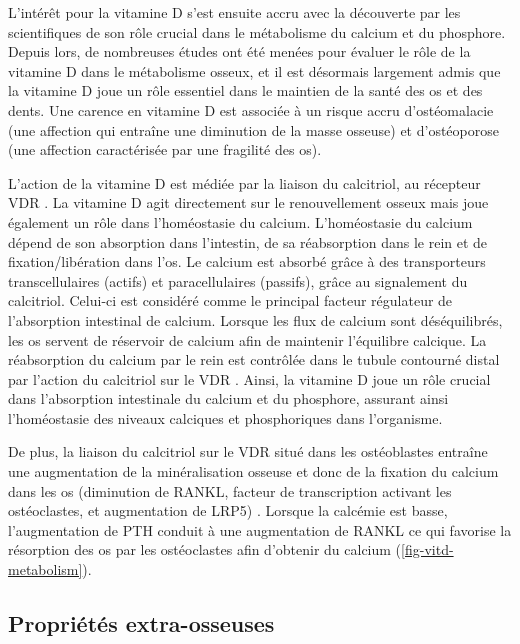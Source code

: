 \documentclass[
  a4paper,
  DIV=11,
  numbers=noendperiod,
  listof=totoc]{scrreprt}
\begin{document}
L'intérêt pour la vitamine D s'est ensuite accru avec la découverte par
les scientifiques de son rôle crucial dans le métabolisme du calcium et
du phosphore. Depuis lors, de nombreuses études ont été menées pour
évaluer le rôle de la vitamine D dans le métabolisme osseux, et il est
désormais largement admis que la vitamine D joue un rôle essentiel dans
le maintien de la santé des os et des dents. Une carence en vitamine D
est associée à un risque accru d'ostéomalacie (une affection qui
entraîne une diminution de la masse osseuse) et d'ostéoporose (une
affection caractérisée par une fragilité des os).

L'action de la vitamine D est médiée par la liaison du calcitriol, au
récepteur \ac{VDR} \autocite{Norman.2008,Dankers.2017}. La vitamine D
agit directement sur le renouvellement osseux mais joue également un
rôle dans l'homéostasie du calcium. L'homéostasie du calcium dépend de
son absorption dans l'intestin, de sa réabsorption dans le rein et de
fixation/libération dans l'os. Le calcium est absorbé grâce à des
transporteurs transcellulaires (actifs) et paracellulaires (passifs),
grâce au signalement du calcitriol. Celui-ci est considéré comme le
principal facteur régulateur de l'absorption intestinal de calcium.
Lorsque les flux de calcium sont déséquilibrés, les os servent de
réservoir de calcium afin de maintenir l'équilibre calcique. La
réabsorption du calcium par le rein est contrôlée dans le tubule
contourné distal par l'action du calcitriol sur le \ac{VDR}
\autocite{Carmeliet.2015}. Ainsi, la vitamine D joue un rôle crucial
dans l'absorption intestinale du calcium et du phosphore, assurant ainsi
l'homéostasie des niveaux calciques et phosphoriques dans l'organisme.

De plus, la liaison du calcitriol sur le VDR situé dans les ostéoblastes
entraîne une augmentation de la minéralisation osseuse et donc de la
fixation du calcium dans les os (diminution de RANKL, facteur de
transcription activant les ostéoclastes, et augmentation de LRP5)
\autocite{Carmeliet.2015}. Lorsque la calcémie est basse, l'augmentation
de \ac{PTH} conduit à une augmentation de RANKL ce qui favorise la
résorption des os par les ostéoclastes afin d'obtenir du calcium
(\cref{fig-vitd-metabolism}).

\hypertarget{propriuxe9tuxe9s-extra-osseuses}{%
\subsection{Propriétés
extra-osseuses}\label{propriuxe9tuxe9s-extra-osseuses}}
\end{document}
